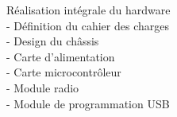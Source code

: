 \documentclass[a4paper]{article}
\begin{document}
{\begin{minipage}[t]{0.6\paperwidth}
{\begin{minipage}[H]{0.58\paperwidth}
		\hspace{1cm} Réalisation intégrale du hardware\\
		\hspace{2cm} - Définition du cahier des charges\\
		\hspace{2cm} - Design du châssis\\
		\hspace{2cm} - Carte d'alimentation\\
		\hspace{2cm} - Carte microcontrôleur\\
		\hspace{2cm} - Module radio\\
		\hspace{2cm} - Module de programmation USB\\
		\end{minipage}\if{}} \fi
	\end{minipage}\if{}} \fi
\end{document}
